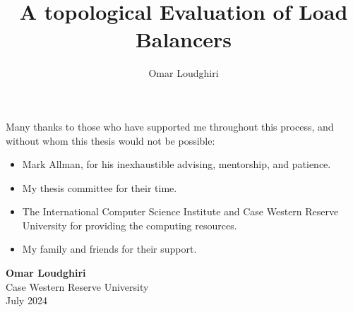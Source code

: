\documentclass[12pt]{cwru_thesis}
\begin{document}

\title{A topological Evaluation of Load Balancers} %
\author{Omar Loudghiri} %



\maketitle


\begin{KeepFromToc}
  \tableofcontents
\end{KeepFromToc}
\listoftables
\listoffigures



\begin{acknowledgements}

\noindent Many thanks to those who have supported me throughout this process, and without whom this thesis would not be possible:

\begin{itemize}
    \item Mark Allman, for his inexhaustible advising, mentorship, and patience.
    \item My thesis committee for their time.
    \item The International Computer Science Institute and Case Western Reserve University for providing the computing resources. 
    \item My family and friends for their support.
\end{itemize}

\vspace{2cm}

\begin{flushright}
\textbf{Omar Loudghiri} \\
Case Western Reserve University \\
July 2024
\end{flushright}
\end{acknowledgements}
\end{document}

